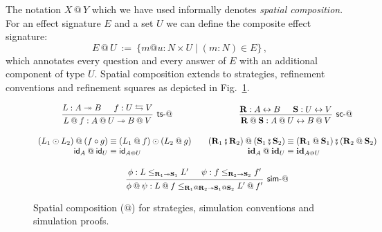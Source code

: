 The notation $X \mathbin@ Y$ which we have used informally
denotes \emph{spatial composition}.
For an effect signature $E$ and a set $U$
we can define the composite effect signature:
\[
  E \mathbin@ U \: := \:
    \{ m @ u : N \times U \mid (m : N) \in E \}
  \,,
\]
which annotates every question and every answer of $E$
with an additional component of type $U$.
Spatial composition extends to strategies,
refinement conventions and refinement squares
as depicted in Fig.~\ref{fig:xcomp}.

\begin{figure} %
  \begin{gather*}
    \begin{prooftree}
      \hypo{L : A \twoheadrightarrow B}
      \hypo{f : U \lensarrow V}
      \infer2[\kw{ts}-$\mathbin@$]{
        L \mathbin@ f : A \mathbin@ U \twoheadrightarrow B \mathbin@ V
      }
    \end{prooftree}
    \hspace{8em}
    \begin{prooftree}
      \hypo{\mathbf{R} : A \leftrightarrow B}
      \hypo{\mathbf{S} : U \leftrightarrow V}
      \infer2[\kw{sc}-$\mathbin@$]{
        \mathbf{R} \mathbin@ \mathbf{S} : A \mathbin@ U \leftrightarrow B \mathbin@ V
      }
    \end{prooftree}
    \\[1em]
    \begin{array}{r@{}l}
      (L_1 \odot L_2) \mathbin@ (f \circ g) & {} \equiv
      (L_1 \mathbin@ f) \odot (L_2 \mathbin@ g) \\
      \kw{id}_A \mathbin@ \kw{id}_U & {} \equiv \kw{id}_{A \mathbin@ U}
    \end{array}
    \quad
    \begin{array}{r@{}l}
      (\mathbf{R}_1 \vcomp \mathbf{R}_2) \mathbin@ (\mathbf{S}_1 \vcomp \mathbf{S}_2)
      & {} \equiv
      (\mathbf{R}_1 \mathbin@ \mathbf{S}_1) \vcomp (\mathbf{R}_2 \mathbin@ \mathbf{S}_2)
      \\
      \idsc_A \mathbin@ \idsc_U & {} \equiv \idsc_{A \mathbin@ U}
    \end{array}
    \\[1em]
    \begin{prooftree}
      \hypo{\phi: L \le_{\mathbf{R}_1 \twoheadrightarrow \mathbf{S}_1} L'}
      \hypo{\psi: f \le_{\mathbf{R}_2 \twoheadrightarrow \mathbf{S}_2} f'}
      \infer2[\kw{sim}-$\mathbin@$]{\phi \mathbin@ \psi :
	L \mathbin@ f
        \le_{\mathbf{R}_1 \mathbin@ \mathbf{R}_2 \twoheadrightarrow
             \mathbf{S}_1 \mathbin@ \mathbf{S}_2}
	L' \mathbin@ f'}
    \end{prooftree}
  \end{gather*}
  \caption{Spatial composition ($\mathbin@$) for strategies,
    simulation conventions and simulation proofs.}
  \label{fig:xcomp}
\end{figure}

